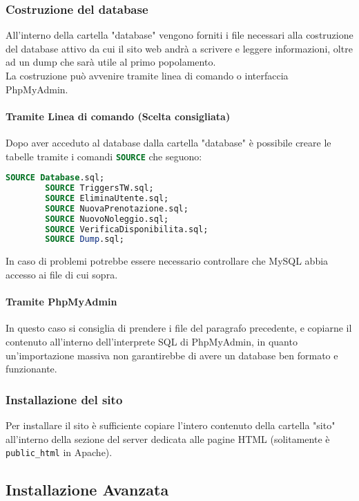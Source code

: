 \subsubsection{Costruzione del database}
All'interno della cartella "database" vengono forniti i file necessari alla costruzione del database attivo da cui il sito web andrà a scrivere e leggere informazioni, oltre ad un dump che sarà utile al primo popolamento.\\
La costruzione può avvenire tramite linea di comando o interfaccia PhpMyAdmin.
\paragraph{Tramite Linea di comando (Scelta consigliata)}
Dopo aver acceduto al database dalla cartella "database" è possibile creare le tabelle tramite i comandi \lstinline[language=sql]{SOURCE} che seguono:
\begin{lstlisting}[language=sql, frame=single]
        SOURCE Database.sql;
        SOURCE TriggersTW.sql;
        SOURCE EliminaUtente.sql;
        SOURCE NuovaPrenotazione.sql;
        SOURCE NuovoNoleggio.sql;
        SOURCE VerificaDisponibilita.sql;
        SOURCE Dump.sql;
\end{lstlisting}
In caso di problemi potrebbe essere necessario controllare che MySQL abbia accesso ai file di cui sopra.
\paragraph{Tramite PhpMyAdmin}
In questo caso si consiglia di prendere i file del paragrafo precedente, e copiarne il contenuto all'interno dell'interprete SQL di PhpMyAdmin, in quanto un'importazione massiva non garantirebbe di avere un database ben formato e funzionante.
\subsubsection{Installazione del sito}
Per installare il sito è sufficiente copiare l'intero contenuto della cartella "sito" all'interno della sezione del server dedicata alle pagine HTML (solitamente è \texttt{public\_html} in Apache).
\subsection{Installazione Avanzata}
